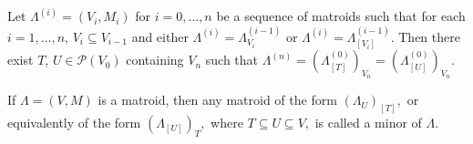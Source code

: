 Let $\Lambda^{(i)} = (V_i, M_i)$ for $i = 0, \ldots, n$ be a sequence of matroids such that for each $i = 1, \ldots, n$, $V_i \subseteq V_{i-1}$ and either $\Lambda^{(i)} = \Lambda_{V_i}^{(i-1)}$ or $\Lambda^{(i)} = \Lambda_{[V_i]}^{(i-1)}$. Then there exist $T$, $U \in \mathcal{P}(V_0)$ containing $V_n$ such that $\Lambda^{(n)} = (\Lambda_{[T]}^{(0)})_{V_n} = (\Lambda_{[U]}^{(0)})_{V_n}.$

If $\Lambda = (V, M)$ is a matroid, then any matroid of the form $(\Lambda_U)_{[T]},$ or equivalently of the form $(\Lambda_{[U]})_{T},$ where $T \subseteq U \subseteq V,$ is called a minor of $\Lambda.$
